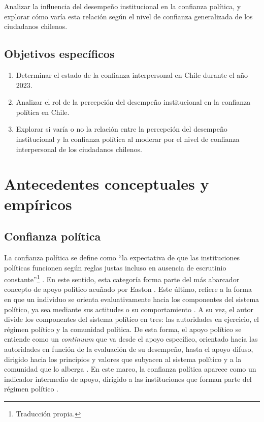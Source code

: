 \documentclass[12pt,twoside]{templates/facsothesis}
\providecommand{\tightlist}{%
  \setlength{\itemsep}{0pt}\setlength{\parskip}{0pt}}
\begin{document}
Analizar la influencia del desempeño institucional en la confianza política, y explorar cómo varía esta relación según el nivel de confianza generalizada de los ciudadanos chilenos.

\section{Objetivos específicos}\label{objetivos-especuxedficos}

\begin{enumerate}
\def\labelenumi{\arabic{enumi}.}
\tightlist
\item
  Determinar el estado de la confianza interpersonal en Chile durante el año 2023.
\item
  Analizar el rol de la percepción del desempeño institucional en la confianza política en Chile.
\item
  Explorar si varía o no la relación entre la percepción del desempeño institucional y la confianza política al moderar por el nivel de confianza interpersonal de los ciudadanos chilenos.
\end{enumerate}

\chapter{Antecedentes conceptuales y empíricos}\label{antecedentes-conceptuales-y-empuxedricos}

\section{Confianza política}\label{confianza-poluxedtica}

La confianza política se define como ``la expectativa de que las instituciones políticas funcionen según reglas justas incluso en ausencia de escrutinio constante''\footnote{Traducción propia.} \citep[16]{marienMeasuringPoliticalTrust2013}. En este sentido, esta categoría forma parte del más abarcador concepto de apoyo político acuñado por Easton \citetext{\citeyear{eastonSystemsAnalysisPolitical1965}; \citeyear{eastonReassessmentConceptPolitical1975}}. Este último, refiere a la forma en que un individuo se orienta evaluativamente hacia los componentes del sistema político, ya sea mediante sus actitudes o su comportamiento \citep{eastonReassessmentConceptPolitical1975}. A su vez, el autor divide los componentes del sistema político en tres: las autoridades en ejercicio, el régimen político y la comunidad política. De esta forma, el apoyo político se entiende como un \emph{continuum} que va desde el apoyo específico, orientado hacia las autoridades en función de la evaluación de su desempeño, hasta el apoyo difuso, dirigido hacia los principios y valores que subyacen al sistema político y a la comunidad que lo alberga \citep{eastonReassessmentConceptPolitical1975, norrisDemocraticDeficitCritical2011}. En este marco, la confianza política aparece como un indicador intermedio de apoyo, dirigido a las instituciones que forman parte del régimen político \citep{vandermeerDeeplyRootedConcern2017, zmerliPoliticalTrust2022}.
\end{document}
